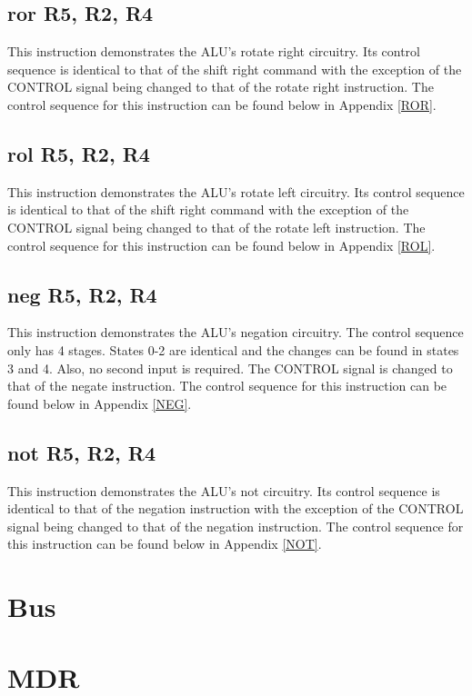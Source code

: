\documentclass{article}
\begin{document}
    \subsection{ror R5, R2, R4}
    This instruction demonstrates the ALU's rotate right circuitry. Its control sequence is identical to that of the shift right command with the exception of the CONTROL signal being changed to that of the rotate right instruction. The control sequence for this instruction can be found below in Appendix \ref{ROR}.
    \subsection{rol R5, R2, R4}
    This instruction demonstrates the ALU's rotate left circuitry. Its control sequence is identical to that of the shift right command with the exception of the CONTROL signal being changed to that of the rotate left instruction. The control sequence for this instruction can be found below in Appendix \ref{ROL}.
    \subsection{neg R5, R2, R4}
    This instruction demonstrates the ALU's negation circuitry. The control sequence only has 4 stages. States 0-2 are identical and the changes can be found in states 3 and 4. Also, no second input is required. The CONTROL signal is changed to that of the negate instruction. The control sequence for this instruction can be found below in Appendix \ref{NEG}.
    \subsection{not R5, R2, R4}
    This instruction demonstrates the ALU's not circuitry. Its control sequence is identical to that of the negation instruction with the exception of the CONTROL signal being changed to that of the negation instruction. The control sequence for this instruction can be found below in Appendix \ref{NOT}.

\appendix
% 
\section{Bus} \label{Bus}
    
\section{MDR}\label{MDR}
    
\end{document}
